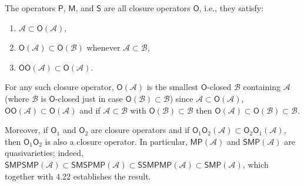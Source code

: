 The operators $\mathsf{P}$, $\mathsf{M}$, and $\mathsf{S}$ are all closure operators $\mathsf{O}$, i.e., they satisfy:
\begin{enumerate}
\item $\mathcal{A} \subset \mathsf{O}(\mathcal{A})$,
\item $\mathsf{O}(\mathcal{A}) \subset \mathsf{O}(\mathcal{B})$ whenever $\mathcal{A} \subset \mathcal{B}$,
\item $\mathsf{O}\mathsf{O}(\mathcal{A}) \subset \mathsf{O}(\mathcal{A})$.
\end{enumerate}

For any such closure operator, $\mathsf{O}(\mathcal{A})$ is the smallest $\mathsf{O}$-closed $\mathcal{B}$ containing $\mathcal{A}$ (where $\mathcal{B}$ is $\mathsf{O}$-closed just in case $\mathsf{O}(\mathcal{B}) \subset \mathcal{B}$) since $\mathcal{A} \subset \mathsf{O}(\mathcal{A})$, $\mathsf{O}\mathsf{O}(\mathcal{A}) \subset \mathsf{O}(\mathcal{A})$ and if $\mathcal{A} \subset \mathcal{B}$ with $\mathsf{O}(\mathcal{B}) \subset \mathcal{B}$ then $\mathsf{O}(\mathcal{A}) \subset \mathsf{O}(\mathcal{B}) \subset \mathcal{B}$.

Moreover, if $\mathsf{O}_1$ and $\mathsf{O}_2$ are closure operators and if $\mathsf{O}_1\mathsf{O}_2(\mathcal{A}) \subset \mathsf{O}_2\mathsf{O}_1(\mathcal{A})$, then $\mathsf{O}_1\mathsf{O}_2$ is also a closure operator. In particular, $\mathsf{MP}(\mathcal{A})$ and $\mathsf{SMP}(\mathcal{A})$ are quasivarieties; indeed, $\mathsf{SMPSMP}(\mathcal{A}) \subset \mathsf{SMSPMP}(\mathcal{A}) \subset \mathsf{SSMPMP}(\mathcal{A}) \subset \mathsf{SMP}(\mathcal{A})$, which together with 4.22 establishes the result.
